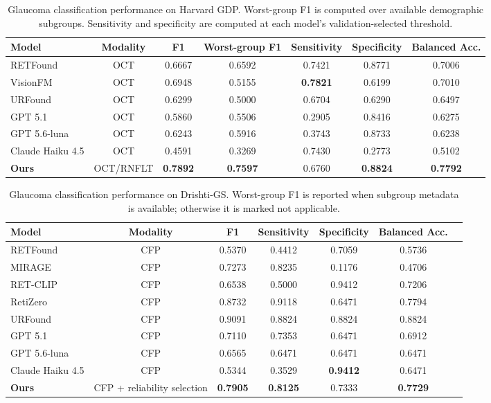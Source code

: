 \begin{table}[h]
\centering
\caption{Glaucoma classification performance on Harvard GDP. Worst-group F1 is computed over available demographic subgroups. Sensitivity and specificity are computed at each model's validation-selected threshold.}
\label{tab:glaucoma_gdp}
\begin{tabular}{lcccccc}
\toprule
\textbf{Model} & \textbf{Modality} & \textbf{F1} & \textbf{Worst-group F1} & \textbf{Sensitivity} & \textbf{Specificity} & \textbf{Balanced Acc.} \\
\midrule
RETFound & OCT & 0.6667 & 0.6592 & 0.7421 & 0.8771 & 0.7006 \\
VisionFM & OCT & 0.6948 & 0.5155 & \textbf{0.7821} & 0.6199 & 0.7010 \\
URFound & OCT & 0.6299 & 0.5000 & 0.6704 & 0.6290 & 0.6497 \\
GPT 5.1 & OCT & 0.5860 & 0.5506 & 0.2905 & 0.8416 & 0.6275 \\
GPT 5.6-luna & OCT & 0.6243 & 0.5916 & 0.3743 & 0.8733 & 0.6238 \\
Claude Haiku 4.5 & OCT & 0.4591 & 0.3269 & 0.7430 & 0.2773 & 0.5102 \\
\textbf{Ours} & OCT/RNFLT & \textbf{0.7892} & \textbf{0.7597} & 0.6760 & \textbf{0.8824} & \textbf{0.7792} \\
\bottomrule
\end{tabular}
\end{table}

\begin{table}[h]
\centering
\caption{Glaucoma classification performance on Drishti-GS. Worst-group F1 is reported when subgroup metadata is available; otherwise it is marked not applicable.}
\label{tab:glaucoma_drishtigs}
\begin{tabular}{lcccccc}
\toprule
\textbf{Model} & \textbf{Modality} & \textbf{F1} & \textbf{Sensitivity} & \textbf{Specificity} & \textbf{Balanced Acc.} \\
\midrule
RETFound & CFP & 0.5370 & 0.4412 & 0.7059 & 0.5736 \\
MIRAGE & CFP & 0.7273 & 0.8235 & 0.1176 & 0.4706 \\
RET-CLIP & CFP & 0.6538 & 0.5000 & 0.9412 & 0.7206 \\
RetiZero & CFP & 0.8732 & 0.9118 & 0.6471 & 0.7794 \\
URFound & CFP & 0.9091 & 0.8824 & 0.8824 & 0.8824 \\
GPT 5.1 & CFP & 0.7110 & 0.7353 & 0.6471 & 0.6912 \\
GPT 5.6-luna & CFP & 0.6565 & 0.6471 & 0.6471 & 0.6471 \\
Claude Haiku 4.5 & CFP & 0.5344 & 0.3529 & \textbf{0.9412} & 0.6471 \\
\textbf{Ours} & CFP + reliability selection & \textbf{0.7905} & \textbf{0.8125} & 0.7333 & \textbf{0.7729} \\
\bottomrule
\end{tabular}
\end{table}

